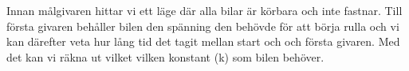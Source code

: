 Innan målgivaren hittar vi ett läge där alla bilar är körbara och inte fastnar.
Till första givaren behåller bilen den spänning den behövde för att börja rulla
och vi kan därefter veta hur lång tid det tagit mellan start och och första
givaren. Med det kan vi räkna ut vilket vilken konstant (k) som bilen behöver. 
